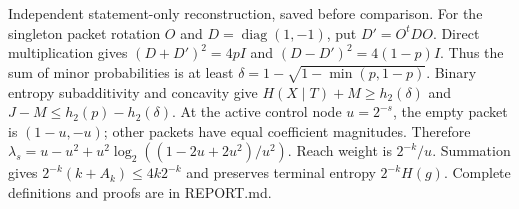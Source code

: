 \documentclass{article}
\begin{document}
Independent statement-only reconstruction, saved before comparison.
For the singleton packet rotation $O$ and $D=\operatorname{diag}(1,-1)$, put $D'=O^tDO$. Direct multiplication gives $(D+D')^2=4pI$ and $(D-D')^2=4(1-p)I$. Thus the sum of minor probabilities is at least $\delta=1-\sqrt{1-\min(p,1-p)}$. Binary entropy subadditivity and concavity give $H(X\mid T)+M\ge h_2(\delta)$ and $J-M\le h_2(p)-h_2(\delta)$.
At the active control node $u=2^{-s}$, the empty packet is $(1-u,-u)$; other packets have equal coefficient magnitudes. Therefore $\lambda_s=u-u^2+u^2\log_2((1-2u+2u^2)/u^2)$. Reach weight is $2^{-k}/u$. Summation gives $2^{-k}(k+A_k)\le4k2^{-k}$ and preserves terminal entropy $2^{-k}H(g)$. Complete definitions and proofs are in REPORT.md.
\end{document}
